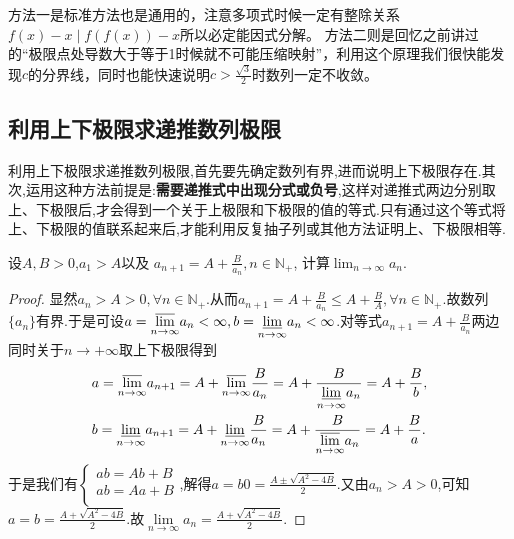 \documentclass[../../main.tex]{subfiles}
\begin{document}
\begin{remark}
{\color{blue}方法一}是标准方法也是通用的，注意多项式时候一定有整除关系\(f(x) - x\mid f(f(x)) - x\)所以必定能因式分解。
{\color{blue}方法二}则是回忆之前讲过的“极限点处导数大于等于1时候就不可能压缩映射”，利用这个原理我们很快能发现\(c\)的分界线，同时也能快速说明\(c>\frac{\sqrt{3}}{2}\)时数列一定不收敛。
\end{remark}







\subsection{利用上下极限求递推数列极限}

利用上下极限求递推数列极限,首先要先确定数列有界,进而说明上下极限存在.其次,运用这种方法前提是:\textbf{需要递推式中出现分式或负号},这样对递推式两边分别取上、下极限后,才会得到一个关于上极限和下极限的值的等式.只有通过这个等式将上、下极限的值联系起来后,才能利用反复抽子列或其他方法证明上、下极限相等.

\begin{example}
设\(A,B > 0\),\(a_1 > A\)以及
\(a_{n + 1} = A + \frac{B}{a_n}, n \in \mathbb{N}_+\),
计算\(\lim_{n \to \infty} a_n\).
\end{example}
\begin{proof}
显然$a_n>A>0,\forall n\in\mathbb{N}_+$.从而$a_{n+1}=A+\frac{B}{a_n}\leqslant  A+\frac{B}{A},\forall n\in\mathbb{N}_+$.故数列$\{a_n\}$有界.于是可设$a=\underset{n\rightarrow \infty}{{\varlimsup }}a_n<\infty,b=\underset{n\rightarrow \infty}{{\varliminf }}a_n<\infty$.对等式$a_{n + 1} = A + \frac{B}{a_n}$两边同时关于$n\to+\infty$取上下极限得到
\begin{align*}
&a=\underset{n\rightarrow \infty}{{\varlimsup }}a_{n+1}=A+\underset{n\rightarrow \infty}{{\varlimsup }}\frac{B}{a_n}=A+\frac{B}{\underset{n\rightarrow \infty}{{\varliminf }}a_n}=A+\frac{B}{b},
\\
&b=\underset{n\rightarrow \infty}{{\varliminf }}a_{n+1}=A+\underset{n\rightarrow \infty}{{\varliminf }}\frac{B}{a_n}=A+\frac{B}{\underset{n\rightarrow \infty}{{\varlimsup }}a_n}=A+\frac{B}{a}.
\end{align*}
于是我们有$\begin{cases}
ab=Ab+B\\
ab=Aa+B\\
\end{cases}$,解得$a=b0=\frac{A\pm\sqrt{A^2-4B}}{2}$.又由$a_n>A>0$,可知$a=b=\frac{A+\sqrt{A^2-4B}}{2}$.故$\underset{n\rightarrow \infty}{\lim}a_n=\frac{A+\sqrt{A^2-4B}}{2}$.
\end{proof}
\end{document}
